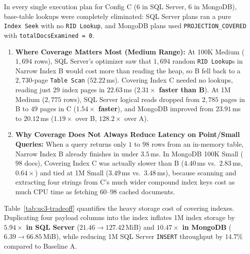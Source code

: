 In every single execution plan for Config C (6 in SQL Server, 6 in MongoDB), base-table lookups were completely eliminated: SQL Server plans ran a pure \texttt{Index Seek} with no \texttt{RID Lookup}, and MongoDB plans used \texttt{PROJECTION\_COVERED} with \texttt{totalDocsExamined = 0}.
\begin{enumerate}
\item \textbf{Where Coverage Matters Most (Medium Range):} At 100K Medium ($1,694$ rows), SQL Server's optimizer saw that $1,694$ random \texttt{RID Lookup}s in Narrow Index B would cost more than reading the heap, so B fell back to a $2,730$-page \texttt{Table Scan} ($52.22$\,ms). Covering Index C needed no lookups, reading just $29$ index pages in $22.63$\,ms (\textbf{$2.31\times$ faster than B}). At 1M Medium ($2,775$ rows), SQL Server logical reads dropped from $2,785$ pages in B to $49$ pages in C (\textbf{$1.54\times$ faster}), and MongoDB improved from $23.91$\,ms to $20.12$\,ms ($1.19\times$ over B, $128.2\times$ over A).
\item \textbf{Why Coverage Does Not Always Reduce Latency on Point/Small Queries:} When a query returns only $1$ to $98$ rows from an in-memory table, Narrow Index B already finishes in under $3.5$\,ms. In MongoDB 100K Small ($98$ docs), Covering Index C was actually slower than B ($4.40$\,ms vs.\ $2.83$\,ms, $0.64\times$) and tied at 1M Small ($3.49$\,ms vs.\ $3.48$\,ms), because scanning and extracting four strings from C's much wider compound index keys cost as much CPU time as fetching $60$--$98$ cached documents.
\end{enumerate}

Table~\ref{tab:uc3-tradeoff} quantifies the heavy storage cost of covering indexes. Duplicating four payload columns into the index inflates 1M index storage by \textbf{$5.94\times$ in SQL Server} ($21.46 \rightarrow 127.42$\,MiB) and \textbf{$10.47\times$ in MongoDB} ($6.39 \rightarrow 66.85$\,MiB), while reducing 1M SQL Server \texttt{INSERT} throughput by $14.7\%$ compared to Baseline A.

